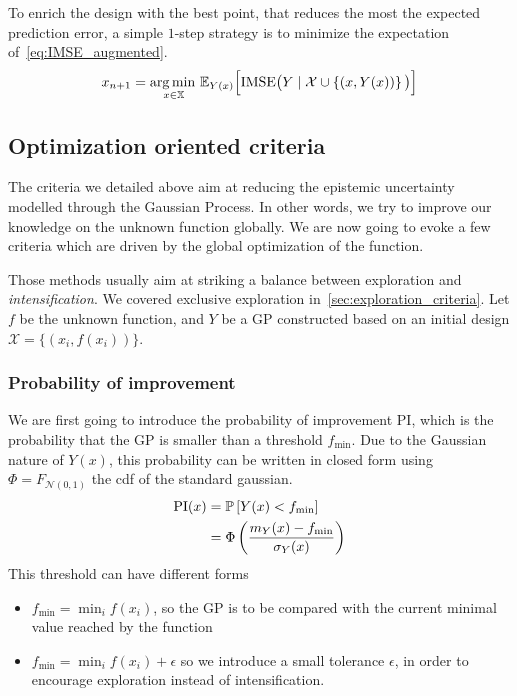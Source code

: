 \documentclass[../../Main_ManuscritThese.tex]{subfiles}
\begin{document}
To enrich the design with the best point, that reduces the most the expected prediction error, a simple $1$-step strategy is to minimize the expectation of~\cref{eq:IMSE_augmented}.
\begin{equation}
  x_{n+1} = \operatorname*{arg\,min \,}_{x\in \mathbb{X}}\mathbb{E}_{Y(x)}\Big[\mathrm{IMSE} \big(Y \mid \mathcal{X} \cup \left\{(x, Y(x))\right\} \big)\Big]
\end{equation}


\subsection{Optimization oriented criteria}
\label{sec:GP_optimization_criteria}
The criteria we detailed above aim at reducing the epistemic uncertainty modelled through the Gaussian Process. In other words, we try to improve our knowledge on the unknown function globally. We are now going to evoke a few criteria which are driven by the global optimization of the function.

Those methods usually aim at striking a balance between exploration and \emph{intensification}. We covered exclusive exploration in~\cref{sec:exploration_criteria}.
Let $f$ be the unknown function, and $Y$ be a GP constructed based on an initial design $\mathcal{X} = \{(x_i, f(x_i))\}$.
\subsubsection{Probability of improvement}
We are first going to introduce the probability of improvement $\mathrm{PI}$, which is the probability that the GP is smaller than a threshold $f_{\min}$. Due to the Gaussian nature of $Y(x)$, this probability can be written in closed form using $\Phi = F_{\mathcal{N}(0, 1)}$ the cdf of the standard gaussian.
\begin{align}
  \mathrm{PI}(x) &= \Prob%
                   \left[Y(x) < f_{\min}\right] \\
                 &= \Phi\left(\frac{m_Y(x) - f_{\min}}{\sigma_Y(x)}\right)
\end{align}
This threshold can have different forms
\begin{itemize}
\item $f_{\min} = \min_{i} f(x_i)$, so the GP is to be compared with the current minimal value reached by the function
\item $f_{\min} = \min_i f(x_i) + \epsilon$ so we introduce a small tolerance $\epsilon$, in order to encourage exploration instead of intensification.
\end{itemize}
\end{document}
